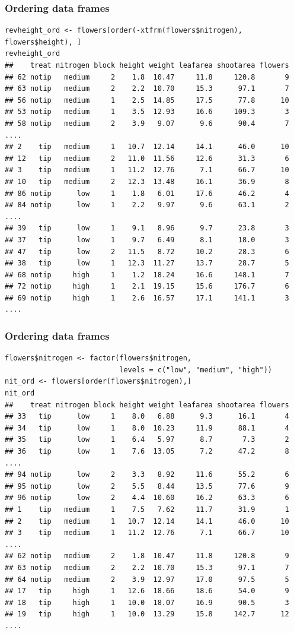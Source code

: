 \documentclass{beamer}
\newcommand{\bfr}[1]{\begin{frame}[fragile]\frametitle{{ #1 }}}
\begin{document}
\bfr{Ordering data frames}
\scriptsize
\begin{verbatim}
revheight_ord <- flowers[order(-xtfrm(flowers$nitrogen), flowers$height), ]        
revheight_ord
##    treat nitrogen block height weight leafarea shootarea flowers
## 62 notip   medium     2    1.8  10.47     11.8     120.8       9
## 63 notip   medium     2    2.2  10.70     15.3      97.1       7
## 56 notip   medium     1    2.5  14.85     17.5      77.8      10
## 53 notip   medium     1    3.5  12.93     16.6     109.3       3
## 58 notip   medium     2    3.9   9.07      9.6      90.4       7
....
## 2    tip   medium     1   10.7  12.14     14.1      46.0      10
## 12   tip   medium     2   11.0  11.56     12.6      31.3       6
## 3    tip   medium     1   11.2  12.76      7.1      66.7      10
## 10   tip   medium     2   12.3  13.48     16.1      36.9       8
## 86 notip      low     1    1.8   6.01     17.6      46.2       4
## 84 notip      low     1    2.2   9.97      9.6      63.1       2
....
## 39   tip      low     1    9.1   8.96      9.7      23.8       3
## 37   tip      low     1    9.7   6.49      8.1      18.0       3
## 47   tip      low     2   11.5   8.72     10.2      28.3       6
## 38   tip      low     1   12.3  11.27     13.7      28.7       5
## 68 notip     high     1    1.2  18.24     16.6     148.1       7
## 72 notip     high     1    2.1  19.15     15.6     176.7       6
## 69 notip     high     1    2.6  16.57     17.1     141.1       3
....
\end{verbatim}
\end{frame}


\bfr{Ordering data frames}
\scriptsize
\begin{verbatim}
flowers$nitrogen <- factor(flowers$nitrogen, 
                           levels = c("low", "medium", "high"))    
nit_ord <- flowers[order(flowers$nitrogen),]
nit_ord
##    treat nitrogen block height weight leafarea shootarea flowers
## 33   tip      low     1    8.0   6.88      9.3      16.1       4
## 34   tip      low     1    8.0  10.23     11.9      88.1       4
## 35   tip      low     1    6.4   5.97      8.7       7.3       2
## 36   tip      low     1    7.6  13.05      7.2      47.2       8
....
## 94 notip      low     2    3.3   8.92     11.6      55.2       6
## 95 notip      low     2    5.5   8.44     13.5      77.6       9
## 96 notip      low     2    4.4  10.60     16.2      63.3       6
## 1    tip   medium     1    7.5   7.62     11.7      31.9       1
## 2    tip   medium     1   10.7  12.14     14.1      46.0      10
## 3    tip   medium     1   11.2  12.76      7.1      66.7      10
....
## 62 notip   medium     2    1.8  10.47     11.8     120.8       9
## 63 notip   medium     2    2.2  10.70     15.3      97.1       7
## 64 notip   medium     2    3.9  12.97     17.0      97.5       5
## 17   tip     high     1   12.6  18.66     18.6      54.0       9
## 18   tip     high     1   10.0  18.07     16.9      90.5       3
## 19   tip     high     1   10.0  13.29     15.8     142.7      12
....
\end{verbatim}
\end{frame}
\end{document}

